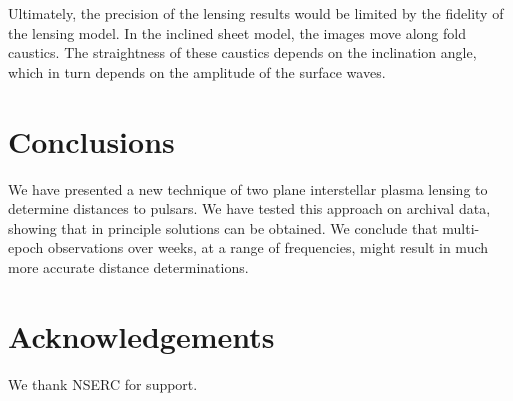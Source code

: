 \documentclass[useAMS,usenatbib]{mn2e}
\begin{document}
Ultimately, the precision of the lensing results would be limited by
the fidelity of the lensing model.  In the inclined sheet model, the
images move along fold caustics.  The straightness of these caustics
depends on the inclination angle, which in turn depends on the
amplitude of the surface waves.

\section{Conclusions}

We have presented a new technique of two plane interstellar plasma
lensing to determine distances to pulsars.  We have tested this
approach on archival data, showing that in principle solutions can be
obtained.  We conclude that multi-epoch observations over weeks, at a
range of frequencies, might result in much more accurate distance
determinations.


\section{Acknowledgements}

We thank NSERC for support.


\newcommand{\araa}{ARA\&A}   %
\newcommand{\afz}{Afz}       %
\newcommand{\aj}{AJ}         %
\newcommand{\azh}{AZh}       %
\newcommand{\aaa}{A\&A}      %
\newcommand{\aas}{A\&AS}     %
\newcommand{\aar}{A\&AR}     %
\newcommand{\apj}{ApJ}       %
\newcommand{\apjs}{ApJS}     %
\newcommand{\apjl}{ApJ}      %
\newcommand{\apss}{Ap\&SS}   %
\newcommand{\baas}{BAAS}     %
\newcommand{\jaa}{JA\&A}     %
\newcommand{\mnras}{MNRAS}   %
\newcommand{\nat}{Nat}       %
\newcommand{\pasj}{PASJ}     %
\newcommand{\pasp}{PASP}     %
\newcommand{\paspc}{PASPC}   %
\newcommand{\qjras}{QJRAS}   %
\newcommand{\sci}{Sci}       %
\newcommand{\solphys}{Solar Physics}       %
\newcommand{\sova}{SvA}      %
\newcommand{\aap}{A\&A}
\newcommand\jcap{{J. Cosmology Astropart. Phys.}}%
\newcommand{\prd}{Phys. Rev. D}






\label{lastpage}
\end{document}
